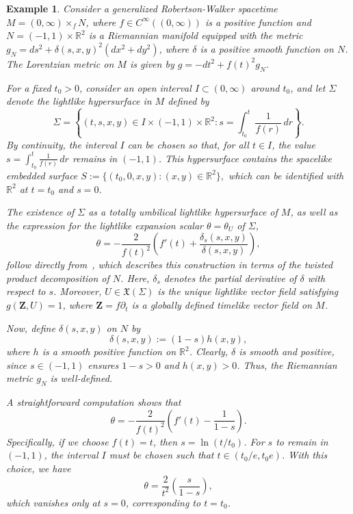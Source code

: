 \documentclass[11pt]{article}
\numberwithin{equation}{section}
\newtheorem{example}[theorem]{Example}
\begin{document}
\begin{example}\label{counterexample_GRW}
	\normalfont
	Consider a generalized Robertson-Walker spacetime~\cite{AliasRomeroSanchez1995} \( M = (0,\infty) \times_f N \), where \( f \in C^\infty((0,\infty)) \) is a positive function and \( N = (-1,1) \times \mathbb{R}^2 \) is a Riemannian manifold equipped with the metric \( g_N = ds^2 + \delta(s, x, y)^2 (dx^2 + dy^2) \), where \( \delta \) is a positive smooth function on \( N \). The Lorentzian metric on \( M \) is given by \( g = -dt^2 + f(t)^2 g_N \).
	
	For a fixed \( t_0 > 0 \), consider an open interval \( I \subset (0, \infty) \) around \( t_0 \), and let \( \Sigma \) denote the lightlike hypersurface in \( M \) defined by
	\[
	\Sigma = \left\{ (t, s, x, y) \in I \times (-1,1) \times \mathbb{R}^2 : s = \int_{t_0}^t \frac{1}{f(r)}\, dr \right\}.
	\]
	By continuity, the interval \( I \) can be chosen so that, for all \( t \in I \), the value \( s = \int_{t_0}^t \frac{1}{f(r)}\, dr \) remains in \( (-1,1) \). This hypersurface contains the spacelike embedded surface
	\(
	S := \{ (t_0, 0, x, y) : (x, y) \in \mathbb{R}^2 \},
	\)
	which can be identified with \( \mathbb{R}^2 \) at \( t = t_0 \) and \( s = 0 \).
	
	The existence of \( \Sigma \) as a totally umbilical lightlike hypersurface of \( M \), as well as the expression for the lightlike expansion scalar \( \theta = \theta_U \) of \( \Sigma \),
	\[
		\theta = -\frac{2}{f(t)^2} \left( f'(t) + \frac{\delta_s(s, x, y)}{\delta(s, x, y)} \right),
	\]
	follow directly from~\cite[Th.~4.2]{gutierrez15}, which describes this construction in terms of the twisted product decomposition of 
	\( N \). Here, \( \delta_s \) denotes the partial derivative of \( \delta \) with respect to \( s \). Moreover, \( U \in \mathfrak{X}(\Sigma) \) is the unique lightlike vector field satisfying \( g(\mathbf{Z}, U) = 1 \), where \( \mathbf{Z} = f\partial_t \) is a globally defined timelike vector field on \( M \).
	
	Now, define \( \delta(s, x, y) \) on \( N \) by
	\[
	\delta(s, x, y) := (1-s) h(x, y),
	\]
	where \( h \) is a smooth positive function on \( \mathbb{R}^2 \). Clearly, \( \delta \) is smooth and positive, since \( s \in (-1,1) \) ensures \( 1-s > 0 \) and \( h(x, y) > 0 \). Thus, the Riemannian metric \( g_N \) is well-defined.
	
	A straightforward computation shows that
	\[
		\theta = -\frac{2}{f(t)^2} \left( f'(t) - \frac{1}{1-s} \right).
	\]
	Specifically, if we choose \( f(t) = t \), then \( s = \ln(t/t_0) \). For \( s \) to remain in \( (-1,1) \), the interval \( I \) must be chosen such that \( t \in (t_0/e, t_0 e) \). With this choice, we have
	\[
		\theta = \frac{2}{t^2} \left( \frac{s}{1-s} \right),
	\]
	which vanishes only at \( s = 0 \), corresponding to $t=t_0$.
	

\end{example}
\end{document}
